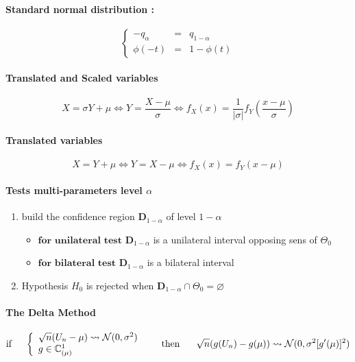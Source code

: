 \documentclass[a4paper,10pt]{article}
\begin{document}
\paragraph{Standard normal distribution :} 
\[
\left\{
\begin{array}{rcl}
-q_{\alpha} &=& q_{1-\alpha}   \\
\phi(-t)    &=& 1 - \phi(t)
\end{array}\right.
\]
\paragraph{Translated and Scaled variables}
\[
X=\sigma Y+\mu 
\Longleftrightarrow
Y=\frac{X-\mu}{\sigma}
\Longleftrightarrow
f_{X}(x) = \frac{1}{|\sigma|} f_{Y}(\frac{x-\mu}{\sigma}) 
\]
\paragraph{Translated variables}
\[
X= Y+\mu 
\Longleftrightarrow
Y=X-\mu
\Longleftrightarrow
f_{X}(x) = f_{Y}(x-\mu) 
\]
\paragraph{Tests multi-parameters level $\alpha$} 
\begin{enumerate}
 \item build the confidence region $\textbf{D}_{1-\alpha}$ of level $1-\alpha$ 
 \begin{itemize}
 \item $\textbf{for unilateral test}$ $\textbf{D}_{1-\alpha}$ is a unilateral interval opposing sens of $\Theta_0$ 
 \item $\textbf{for bilateral test}$ $\textbf{D}_{1-\alpha}$ is a bilateral interval
 \end{itemize}
 \item Hypothesis $H_0$ is rejected when $\textbf{D}_{1-\alpha} \cap \Theta_0 = \varnothing$
\end{enumerate}

\paragraph{The Delta Method}
\[
\text{if} \hspace{5mm} 
\left\{ 
\begin{array}{l}
\sqrt{n}(U_n - \mu) \rightsquigarrow   \mathcal{N}(0,\sigma^{2}) \\
g \in \mathbb{C}^1_{(\mu)}
\end{array}\right. 
\hspace{5mm} \text{ then  } \hspace{5mm}
\sqrt{n}(g(U_n) - g(\mu) ) \rightsquigarrow   \mathcal{N}(0,\sigma^{2}[g'(\mu)]^2) 
\]
\end{document}
